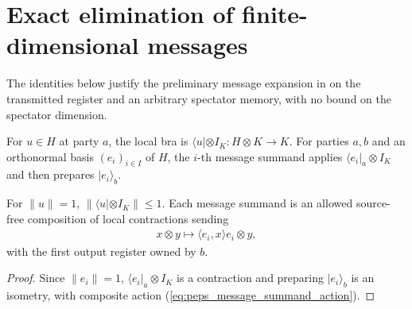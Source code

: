 \section{Exact elimination of finite-dimensional messages}
\label{sec:peps_message_expansion}

The identities below justify the preliminary message expansion in
\cite[Theorem~5.2]{OpenAI2026PolynomialPEPS} on the transmitted register and an
arbitrary spectator memory, with no bound on the spectator dimension.

\begin{definition}
    \label{def:peps_local_message_summand}
    \leanok
    For $u\in H$ at party $a$, the local bra is
    $\langle u|\otimes I_K:H\otimes K\to K$. For parties $a,b$ and an
    orthonormal basis $(e_i)_{i\in I}$ of $H$, the $i$-th message summand
    applies $\langle e_i|_a\otimes I_K$ and then prepares $|e_i\rangle_b$.
\end{definition}

\begin{lemma}
    \label{thm:peps_local_message_summands}
    \leanok
    For $\|u\|=1$, $\|\langle u|\otimes I_K\|\le 1$. Each message summand is an
    allowed source-free composition of local contractions sending
    \begin{align}
        x\otimes y\longmapsto \langle e_i,x\rangle e_i\otimes y,
        \label{eq:peps_message_summand_action}
    \end{align}
    with the first output register owned by $b$.
\end{lemma}
\begin{proof}
    \leanok
    Since $\|e_i\|=1$, $\langle e_i|_a\otimes I_K$ is a contraction and
    preparing $|e_i\rangle_b$ is an isometry, with composite action
    (\ref{eq:peps_message_summand_action}).
\end{proof}

